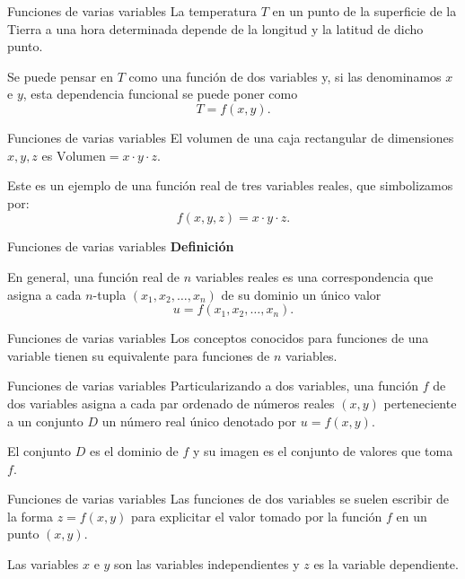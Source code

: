 \documentclass[main.tex]{subfiles}
\begin{document}
\graphicspath{{imagenes/tema1/}{../imagenes/tema1/}}

\begin{frame}{Funciones de varias variables}
La temperatura $T$ en un punto de la superficie de la Tierra a una hora determinada depende de la longitud y la latitud de dicho punto.
\medskip

Se puede pensar en $T$ como una función de dos variables y, si las denominamos $x$ e $y$, esta dependencia funcional se puede poner como
\[T=f(x,y).\]
\end{frame}
\begin{frame}{Funciones de varias variables}
El volumen de una caja rectangular de dimensiones $x,y,z$ es $\text{Volumen}=x\cdot y\cdot z$.
\medskip

Este es un ejemplo de una función real de tres variables reales, que simbolizamos por:
\[f(x,y,z)=x\cdot y\cdot z.\]
\end{frame}
\begin{frame}{Funciones de varias variables}
\textbf{Definición}
\medskip

En general, una función real de $n$ variables reales es una correspondencia que asigna a cada $n$-tupla $(x_1,x_2,\ldots,x_n)$ de su dominio un único valor
\[u=f(x_1,x_2,\ldots,x_n).\]
\end{frame}
\begin{frame}{Funciones de varias variables}
Los conceptos conocidos para funciones de una variable tienen su equivalente para funciones de $n$ variables.
\end{frame}
\begin{frame}{Funciones de varias variables}
Particularizando a dos variables, una función $f$ de dos variables asigna a cada par ordenado de números reales $(x,y)$ perteneciente a un conjunto $D$ un número real único denotado por $u=f(x,y)$.
\medskip

El conjunto $D$ es el dominio de $f$ y su imagen es el conjunto de valores que toma $f$.
\end{frame}
\begin{frame}{Funciones de varias variables}
Las funciones de dos variables se suelen escribir de la forma $z=f(x,y)$ para explicitar el valor tomado por la función $f$ en un punto $(x,y)$.
\medskip

Las variables $x$ e $y$ son las variables independientes y $z$ es la variable dependiente.
\end{frame}
\end{document}
